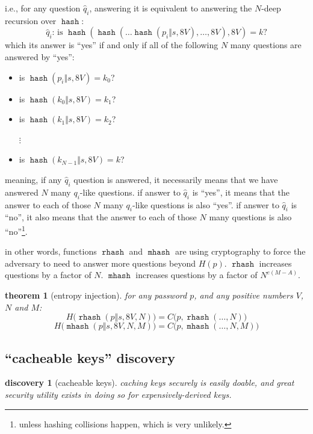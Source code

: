 \documentclass[twocolumn]{article}
\newtheorem{theorem}{theorem}
\newtheorem{discovery}{discovery}
\DeclareMathOperator{\hash}{\mathtt{hash}}
\DeclareMathOperator{\rhash}{\mathtt{rhash}}
\DeclareMathOperator{\mhash}{\mathtt{mhash}}
\begin{document}
i.e., for any question $\hat q_i$, answering it is equivalent to answering
the $N$-deep recursion over $\hash$:
\[
    \text{$\hat q_i$: is }\hash(\hash(\ldots\hash(p_i \Vert s, 8V), \ldots,
    8V), 8V) = k \text{?}
\]
which its answer is ``yes'' if and only if all of the following $N$ many
questions are answered by ``yes'':
\begin{itemize}
    \item is $\hash(p_i \Vert s, 8V) = k_0$?
    \item is $\hash(k_0 \Vert s, 8V) = k_1$?
    \item is $\hash(k_1 \Vert s, 8V) = k_2$?

    $\vdots$

    \item is $\hash(k_{N-1} \Vert s, 8V) = k$?
\end{itemize}

meaning, if any $\hat q_i$ question is answered, it necessarily means that
we have answered $N$ many $q_i$-like questions.  if answer to $\hat q_i$ is
``yes'', it means that the answer to each of those $N$ many $q_i$-like
questions is also ``yes''.  if answer to $\hat q_i$ is ``no'', it also
means that the answer to each of those $N$ many questions is also
``no''\footnote{unless hashing collisions happen, which is very unlikely.}.

in other words, functions $\rhash$ and $\mhash$ are using cryptography to
force the adversary to need to answer more questions beyond $H(p)$.
$\rhash$ increases questions by a factor of $N$.  $\mhash$ increases
questions by a factor of $N^{e(M-A)}$.

\begin{theorem}[entropy injection] \label{theorem_entropy_injection}
    for any password $p$, and any positive numbers $V$, $N$ and $M$:
    \[
        H\Big(\rhash(p\Vert s, 8V, N)\Big) = C\Big(p, \rhash(\ldots, N)\Big)
    \]
    \[
        H\Big(\mhash(p\Vert s, 8V, N, M)\Big) = C\Big(p, \mhash(\ldots, N,
        M)\Big)
    \]
\end{theorem}

\subsection{``cacheable keys'' discovery}
\begin{discovery}[cacheable keys]\label{discov_key_caching}
    caching keys securely is easily doable, and great security utility
    exists in doing so for expensively-derived keys.
\end{discovery}
\end{document}
